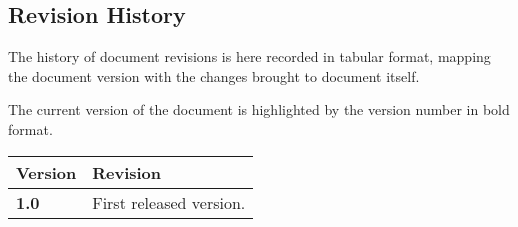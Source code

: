 \subsection{Revision History}

The history of document revisions is here recorded in tabular format, mapping the document version with the changes brought to document itself.

The current version of the document is highlighted by the version number in bold format.

\begin{longtable}{ |l|p{7cm}| }
        \hline
        \textbf{Version} & \textbf{Revision}\\ \hline
        \textbf{1.0} & First released version.\\ \hline
\end{longtable}
~               
